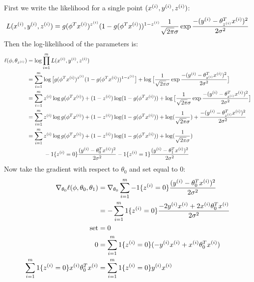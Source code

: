 \documentclass[11pt]{article}
\begin{document}
First we write the likelihood for a single point $(x^{(i)}, y^{(i)}, z^{(i)})$:\\
\begin{align*}
    L(x^{(i)},y^{(i)},z^{(i)}) = g(\phi^T x^{(i)})^{z^{(i)}} (1 - g(\phi^T x^{(i)}))^{1 - z^{(i)}} \frac{1}{\sqrt{2 \pi} \sigma} \exp{\frac{-(y^{(i)}- \theta_{z^{(i)}}^T x^{(i)})^2}{2 \sigma^2}} \\ 
\end{align*}
Then the log-likelihood of the parameters is:
\begin{align*}
    \ell(\phi,\theta_{z^{(i)}}) &= \log \prod_{i=1}^m L(x^{(i)},y^{(i)},z^{(i)}) \\
                              &= \sum_{i=1}^m \log\big[g(\phi^T x^{(i)})^{z^{(i)}} (1 - g(\phi^T x^{(i)}))^{1 - z^{(i)}}\big] + \log\big[\frac{1}{\sqrt{2 \pi} \sigma} \exp{\frac{-(y^{(i)}- \theta_{z^{(i)}}^T x^{(i)})^2}{2 \sigma^2}}\big] \\
                              &= \sum_{i=1}^m z^{(i)} \log g(\phi^T x^{(i)}) + (1 - z^{(i)}) \log (1 - g(\phi^T x^{(i)})) + \log\big[\frac{1}{\sqrt{2 \pi} \sigma} \exp{\frac{-(y^{(i)}- \theta_{z^{(i)}}^T x^{(i)})^2}{2 \sigma^2}}\big] \\
                              &= \sum_{i=1}^m z^{(i)} \log g(\phi^T x^{(i)}) + (1 - z^{(i)}) \log (1 - g(\phi^T x^{(i)})) + \log (\frac{1}{\sqrt{2 \pi} \sigma}) +  \frac{-(y^{(i)} - \theta_{z^{(i)}}^T x^{(i)})^2}{2 \sigma^2} \\
                              &= \sum_{i=1}^m z^{(i)} \log g(\phi^T x^{(i)}) + (1 - z^{(i)}) \log (1 - g(\phi^T x^{(i)})) + \log (\frac{1}{\sqrt{2 \pi} \sigma}) \\
                              &\quad\quad\quad - 1\{z^{(i)} = 0\} \frac{(y^{(i)} - \theta_0^T x^{(i)})^2}{2 \sigma^2} - 1\{z^{(i)} = 1\} \frac{(y^{(i)} - \theta_1^T x^{(i)})^2}{2 \sigma^2} \\
\end{align*}
Now take the gradient with respect to $\theta_0$ and set equal to $0$:
\begin{align*}
    \nabla_{\theta_0} \ell(\phi,\theta_0,\theta_1) &= \nabla_{\theta_0} \sum_{i=1}^m -1\{z^{(i)} = 0\} \frac{(y^{(i)} - \theta_0^T x^{(i)})^2}{2 \sigma^2} \\ 
                                                   &= - \sum_{i=1}^m 1\{z^{(i)} = 0\} \frac{-2 y^{(i)} x^{(i)} + 2 x^{(i)} \theta_0^T x^{(i)}}{2 \sigma^2} \\
                                        \text{set} &= 0 \\
                                                 0 &= \sum_{i=1}^m 1\{z^{(i)} = 0\} (-y^{(i)} x^{(i)} + x^{(i)} \theta_0^T x^{(i)}) \\
    \sum_{i=1}^m 1\{z^{(i)} = 0\} x^{(i)} \theta_0^T x^{(i)} &= \sum_{i=1}^m 1\{z^{(i)} = 0\} y^{(i)} x^{(i)} \\
\end{align*}
\end{document}
